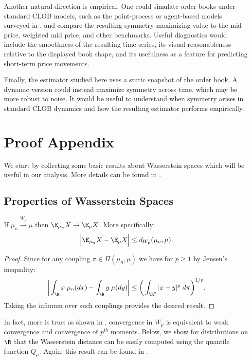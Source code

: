 Another natural direction is empirical. One could simulate order books under
standard CLOB models, such as the point-process or agent-based models surveyed
in \cite{jain2024_limit_order_book_simulations_review}, and compare the resulting
symmetry-maximizing value to the mid price, weighted mid price, and other
benchmarks. Useful diagnostics would include the smoothness of the resulting
time series, its visual reasonableness relative to the displayed book shape, and
its usefulness as a feature for predicting short-term price movements.

Finally, the estimator studied here uses a static snapshot of the order book. A
dynamic version could instead maximize symmetry across time, which may be more
robust to noise. It would be useful to understand when symmetry arises in
standard CLOB dynamics and how the resulting estimator performs empirically.

\newpage
\section{Proof Appendix}

We start by collecting some basic results about Wasserstein spaces which will be useful
in our analysis. More details can be found in \cite{panaretos2020_statistics_wasserstein_space}.

\subsection{Properties of Wasserstein Spaces}

\begin{lemma}
    If $\mu_n \xrightarrow{W_p} \mu$ then $\E_{\mu_n} X \to \E_\mu X$. More specifically:
%
    \[\Big| \E_{\mu_n} X - \E_\mu X \Big| \leq d_{W_p}(\mu_n, \mu).\]
%
    \label{lem:conv_Wp_implies_means_conv}
\end{lemma}
\begin{proof}
    \noindent Since for any coupling $\pi \in \Pi(\mu_n, \mu)$ we have for $p \geq 1$ by Jensen's inequality:
        \[\bigg|\int_\R x \; \mu_n(dx) - \int_\R y \; \mu(dy) \bigg| \leq \bigg(\int_{\R^2} |x - y|^p \; d\pi \bigg)^{1/p}. \]
    \noindent Taking the infimum over such couplings provides the desired result.
\end{proof}

In fact, more is true: as shown in \cite{panaretos2020_statistics_wasserstein_space}, convergence in $W_p$ is equivalent
 to weak convergence and convergence of $p^{th}$ moments. Below, we show for distributions on $\R$
 that the Wasserstein distance can be easily computed using the quantile function $Q_\mu$. Again, this result
 can be found in \cite{panaretos2020_statistics_wasserstein_space}.

